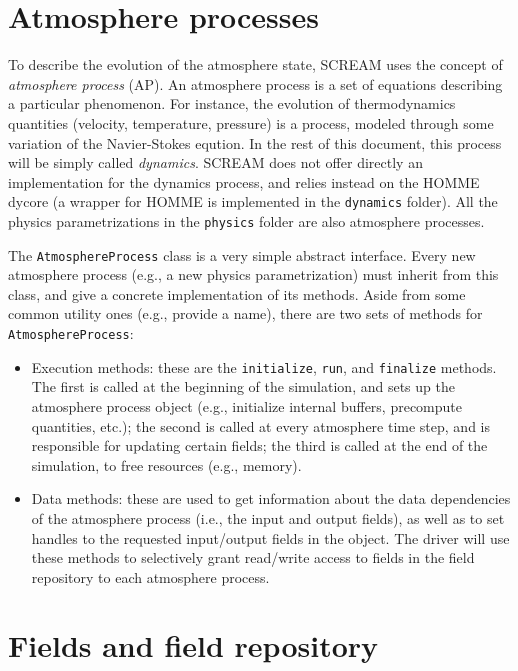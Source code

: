 \documentclass[10pt]{article}
\begin{document}
\section{Atmosphere processes}
\label{sec:processes}
To describe the evolution of the atmosphere state, SCREAM uses the concept
of \emph{atmosphere process} (AP). An atmosphere process is a set
of equations describing a particular phenomenon. For instance, the evolution
of thermodynamics quantities (velocity, temperature, pressure) is a process,
modeled through some variation of the Navier-Stokes eqution. In the rest
of this document, this process will be simply called \emph{dynamics}.
SCREAM does not offer directly an implementation for the dynamics process,
and relies instead on the HOMME dycore (a wrapper for HOMME is implemented in
the \verb|dynamics| folder). All the physics parametrizations in the \verb|physics| folder are also
atmosphere processes.

The \verb|AtmosphereProcess| class is a very simple abstract interface.
Every new atmosphere process (e.g., a new physics parametrization) must
inherit from this class, and give a concrete implementation of its methods.
Aside from some common utility ones (e.g., provide a name), there are
two sets of methods for \verb|AtmosphereProcess|:
\begin{itemize}
\item Execution methods: these are the \verb|initialize|, \verb|run|, and \verb|finalize|
      methods. The first is called at the beginning of the simulation, and sets up the
      atmosphere process object (e.g., initialize internal buffers, precompute
      quantities, etc.); the second is called at every atmosphere time step, and is
      responsible for updating certain fields; the third is called at the end of the
      simulation, to free resources (e.g., memory).
\item Data methods: these are used to get information about the data dependencies
      of the atmosphere process (i.e., the input and output fields), as well as
      to set handles to the requested input/output fields in the object. The driver
      will use these methods to selectively grant read/write access to fields
      in the field repository to each atmosphere process.
\end{itemize}

\section{Fields and field repository}
\label{sec:fields}
\end{document}
